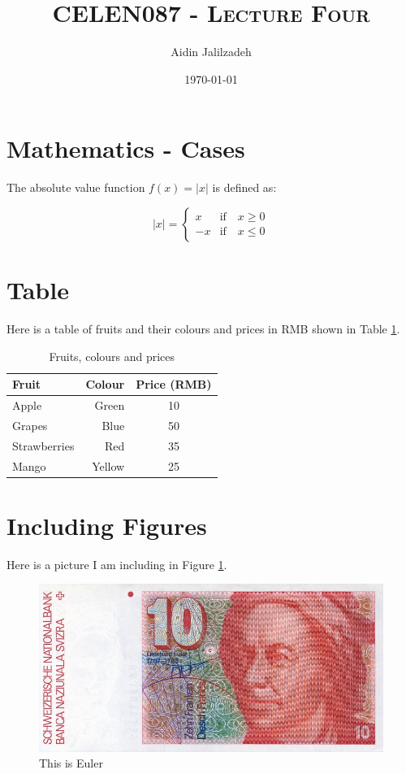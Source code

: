 \documentclass[a4paper,11pt]{article}
\title{\textsc{CELEN087 - Lecture Four}}
\author{Aidin Jalilzadeh}
\date{\today}
\begin{document}
\maketitle

\section{Mathematics - Cases}

The absolute value function $f(x)=|x|$ is defined as:

\begin{equation*}
|x|=
\begin{cases}
x & \textrm{if} \quad x \geq 0 \\
-x & \textrm{if} \quad x \leq 0
\end{cases}
\end{equation*}

\section{Table}
Here is a table of fruits and their colours and prices in RMB shown in Table \ref{T1}.

\begin{table}[h]
\centering
\begin{tabular}{|l|r|c|}
\hline
Fruit & Colour & Price (RMB) \\
\hline
\hline
Apple & Green & 10 \\
\hline
Grapes & Blue & 50\\
\hline
Strawberries & Red & 35\\
\hline
Mango & Yellow & 25\\
\hline
\end{tabular}
\caption{Fruits, colours and prices}
\label{T1}
\end{table}

\newpage
\section{Including Figures}

Here is a picture I am including in Figure \ref{EU}. 

\begin{figure}[t]
\centering
\includegraphics[scale=0.75]{Euler}
\caption{This is Euler}
\label{EU}
\end{figure}
\end{document}
